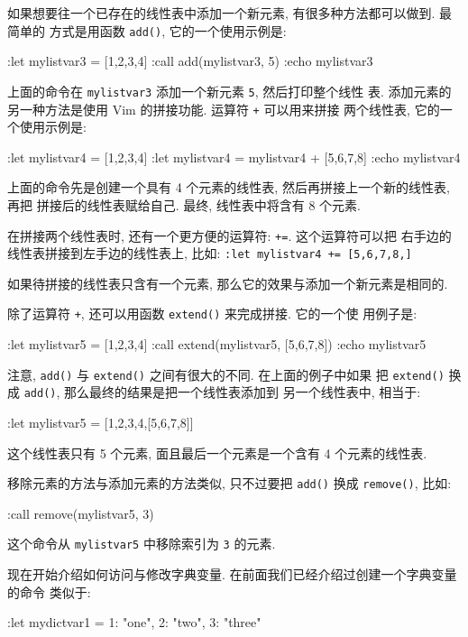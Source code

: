 如果想要往一个已存在的线性表中添加一个新元素, 有很多种方法都可以做到. 最简单的
方式是用函数 \texttt{add()}, 它的一个使用示例是:
\begin{vimcode}
:let mylistvar3 = [1,2,3,4]
:call add(mylistvar3, 5)
:echo mylistvar3
\end{vimcode}
上面的命令在 \texttt{mylistvar3} 添加一个新元素 \texttt{5}, 然后打印整个线性
表. 添加元素的另一种方法是使用 Vim 的拼接功能. 运算符 \texttt{+} 可以用来拼接
两个线性表, 它的一个使用示例是:
\begin{vimcode}
:let mylistvar4 = [1,2,3,4]
:let mylistvar4 = mylistvar4 + [5,6,7,8]
:echo mylistvar4
\end{vimcode}
上面的命令先是创建一个具有 4 个元素的线性表, 然后再拼接上一个新的线性表, 再把
拼接后的线性表赋给自己. 最终, 线性表中将含有 8 个元素.

\begin{warning}
    在拼接两个线性表时, 还有一个更方便的运算符: \texttt{+=}. 这个运算符可以把
    右手边的线性表拼接到左手边的线性表上, 比如: \texttt{:let mylistvar4 +=
    [5,6,7,8,]}
\end{warning}

如果待拼接的线性表只含有一个元素, 那么它的效果与添加一个新元素是相同的.

除了运算符 \texttt{+}, 还可以用函数 \texttt{extend()} 来完成拼接. 它的一个使
用例子是:
\begin{vimcode}
:let mylistvar5 = [1,2,3,4]
:call extend(mylistvar5, [5,6,7,8])
:echo mylistvar5
\end{vimcode}
注意, \texttt{add()} 与 \texttt{extend()} 之间有很大的不同. 在上面的例子中如果
把 \texttt{extend()} 换成 \texttt{add()}, 那么最终的结果是把一个线性表添加到
另一个线性表中, 相当于:
\begin{vimcode}
:let mylistvar5 = [1,2,3,4,[5,6,7,8]]
\end{vimcode}
这个线性表只有 5 个元素, 面且最后一个元素是一个含有 4 个元素的线性表.

移除元素的方法与添加元素的方法类似, 只不过要把 \texttt{add()} 换成
\texttt{remove()}, 比如:
\begin{vimcode}
:call remove(mylistvar5, 3)
\end{vimcode}
这个命令从 \texttt{mylistvar5} 中移除索引为 \texttt{3} 的元素.

现在开始介绍如何访问与修改字典变量. 在前面我们已经介绍过创建一个字典变量的命令
类似于:
\begin{vimcode}
:let mydictvar1 = {1: "one", 2: "two", 3: "three"}
\end{vimcode}

